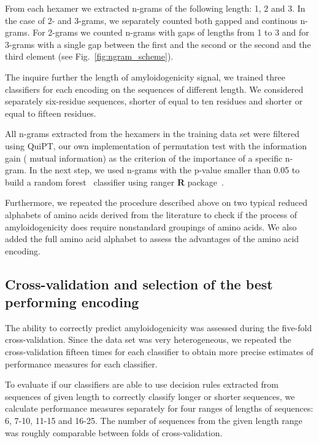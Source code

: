 \documentclass{bioinfo}
\begin{document}
\begin{methods}
  From each hexamer we extracted n-grams of the following length: 1, 2 and 3. In 
the case of 2- and 3-grams, we separately counted both gapped and continous 
n-grams. For 2-grams we counted n-grams with gaps of lengths from 1 to 3 and for 
3-grams with a single gap between the first and the second or the second and the 
third element (see Fig.~\ref{fig:ngram_scheme}).

  The inquire further the length of amyloidogenicity signal, we trained three 
classifiers for each encoding on the sequences of different length. We 
considered separately six-residue sequences, shorter of equal to ten residues 
and shorter or equal to fifteen residues.

  All n-grams extracted from the hexamers in the training data set were filtered 
using QuiPT, our own implementation of permutation test with the information 
gain ( mutual information) as the criterion of the importance of a specific 
n-gram. In the next step, we used n-grams with the p-value smaller than 0.05 to 
build a random forest~\citep{breiman_random_2001} classifier using ranger 
\textbf{R} package~\citep{wright_ranger:_2015}. 

  Furthermore, we repeated the procedure described above on two typical reduced 
alphabets of amino acids derived from the literature to check if the process of 
amyloidogenicity does require nonstandard groupings of amino acids. We also 
added the full amino acid alphabet to assess the advantages of the amino acid 
encoding.

\subsection{Cross-validation and selection of the best performing encoding}

The ability to correctly predict amyloidogenicity was assessed during the 
five-fold cross-validation. Since the data set was very heterogeneous, we 
repeated the cross-validation fifteen times for each classifier to obtain more 
precise estimates of performance measures for each classifier. 

  To evaluate if our classifiers are able to use decision rules extracted from 
sequences of given length to correctly classify longer or shorter sequences, we 
calculate performance measures separately for four ranges of lengths of 
sequences: 6, 7-10, 11-15 and 16-25. The number of sequences from the given 
length range was roughly comparable between folds of cross-validation.
  

\end{methods}
\end{document}

